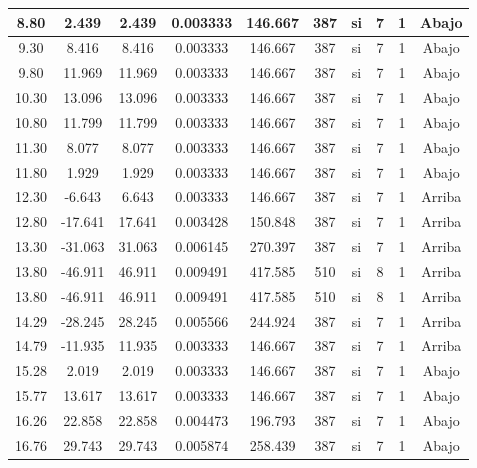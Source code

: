 \begin{table}[H]
{\begin{tabular}{|c|c|c|c|c|c|c|c|c|c|}
    \hline
    8.80 & 2.439 & 2.439 & 0.003333 & 146.667 & 387 & si  & 7   & 1   & Abajo \bigstrut\\
    \hline
    9.30 & 8.416 & 8.416 & 0.003333 & 146.667 & 387 & si  & 7   & 1   & Abajo \bigstrut\\
    \hline
    9.80 & 11.969 & 11.969 & 0.003333 & 146.667 & 387 & si  & 7   & 1   & Abajo \bigstrut\\
    \hline
    10.30 & 13.096 & 13.096 & 0.003333 & 146.667 & 387 & si  & 7   & 1   & Abajo \bigstrut\\
    \hline
    10.80 & 11.799 & 11.799 & 0.003333 & 146.667 & 387 & si  & 7   & 1   & Abajo \bigstrut\\
    \hline
    11.30 & 8.077 & 8.077 & 0.003333 & 146.667 & 387 & si  & 7   & 1   & Abajo \bigstrut\\
    \hline
    11.80 & 1.929 & 1.929 & 0.003333 & 146.667 & 387 & si  & 7   & 1   & Abajo \bigstrut\\
    \hline
    12.30 & -6.643 & 6.643 & 0.003333 & 146.667 & 387 & si  & 7   & 1   & Arriba \bigstrut\\
    \hline
    12.80 & -17.641 & 17.641 & 0.003428 & 150.848 & 387 & si  & 7   & 1   & Arriba \bigstrut\\
    \hline
    13.30 & -31.063 & 31.063 & 0.006145 & 270.397 & 387 & si  & 7   & 1   & Arriba \bigstrut\\
    \hline
    13.80 & -46.911 & 46.911 & 0.009491 & 417.585 & 510 & si  & 8   & 1   & Arriba \bigstrut\\
    \hline
    13.80 & -46.911 & 46.911 & 0.009491 & 417.585 & 510 & si  & 8   & 1   & Arriba \bigstrut\\
    \hline
    14.29 & -28.245 & 28.245 & 0.005566 & 244.924 & 387 & si  & 7   & 1   & Arriba \bigstrut\\
    \hline
    14.79 & -11.935 & 11.935 & 0.003333 & 146.667 & 387 & si  & 7   & 1   & Arriba \bigstrut\\
    \hline
    15.28 & 2.019 & 2.019 & 0.003333 & 146.667 & 387 & si  & 7   & 1   & Abajo \bigstrut\\
    \hline
    15.77 & 13.617 & 13.617 & 0.003333 & 146.667 & 387 & si  & 7   & 1   & Abajo \bigstrut\\
    \hline
    16.26 & 22.858 & 22.858 & 0.004473 & 196.793 & 387 & si  & 7   & 1   & Abajo \bigstrut\\
    \hline
    16.76 & 29.743 & 29.743 & 0.005874 & 258.439 & 387 & si  & 7   & 1   & Abajo \bigstrut\\
    \hline

\end{tabular}}
\end{table}
